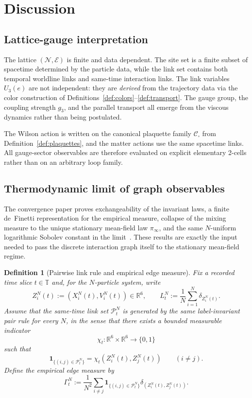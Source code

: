 \documentclass[11pt]{article}
\newtheorem{definition}[theorem]{Definition}
\theoremstyle{remark}
\newcommand{\R}{\mathbb R}
\newcommand{\Tset}{\mathbb T}
\newcommand{\mcN}{\mathcal N}
\newcommand{\mcE}{\mathcal E}
\begin{document}
\section{Discussion}
\label{sec:discussion}

\subsection{Lattice-gauge interpretation}

The lattice $(\mcN,\mcE)$ is finite and data dependent.
The site set is a finite subset of spacetime determined by the particle data,
while the link set contains both temporal worldline links and same-time
interaction links.
The link variables $U_3(e)$ are not independent: they are
\emph{derived} from the trajectory data via the color construction of
Definitions~\ref{def:colors}--\ref{def:transport}.
The gauge group, the coupling strength $g_3$, and the parallel transport
all emerge from the viscous dynamics rather than being postulated.

The Wilson action is written on the canonical plaquette family
$\mathcal C_\square$ from Definition~\ref{def:plaquettes}, and the matter
actions use the same spacetime links.
All gauge-sector observables are therefore evaluated on explicit elementary
2-cells rather than on an arbitrary loop family.

\subsection{Thermodynamic limit of graph observables}

The convergence paper proves exchangeability of the invariant laws, a finite
de~Finetti representation for the empirical measure, collapse of the mixing
measure to the unique stationary mean-field law $\pi_\infty$, and the same
$N$-uniform logarithmic Sobolev constant in the limit~\cite{convergence}.
These results are exactly the input needed to pass the discrete interaction
graph itself to the stationary mean-field regime.

\begin{definition}[Pairwise link rule and empirical edge measure]
\label{def:edge-measure}
Fix a recorded time slice $t\in\Tset$ and, for the $N$-particle system, write
\[
Z_i^N(t):=(X_i^N(t),V_i^N(t))\in\R^6,
\qquad
L_t^N:=\frac1N\sum_{i=1}^N \delta_{Z_i^N(t)}.
\]
Assume that the same-time link set $\mathcal P_t^N$ is generated by the same
label-invariant pair rule for every $N$, in the sense that there exists a
bounded measurable indicator
\[
\chi_t:\R^6\times\R^6\to\{0,1\}
\]
such that
\[
\mathbf 1_{\{(i,j)\in\mathcal P_t^N\}}
=
\chi_t(Z_i^N(t),Z_j^N(t))
\qquad
(i\ne j).
\]
Define the empirical edge measure by
\[
\Gamma_t^N
:=
\frac1{N^2}\sum_{i\ne j}
\mathbf 1_{\{(i,j)\in\mathcal P_t^N\}}
\delta_{(Z_i^N(t),Z_j^N(t))}.
\]
\end{definition}
\end{document}
